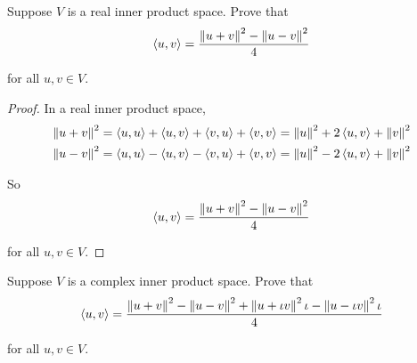 \begin{exercise}
    Suppose $V$ is a real inner product space. Prove that
    \[
        \left\langle{u, v}\right\rangle = \frac{\left\Vert{u + v}\right\Vert^{2} - \left\Vert{u - v}\right\Vert^{2}}{4}
    \]

    for all $u, v\in V$.
\end{exercise}

\begin{proof}
    In a real inner product space,
    \[
        \begin{split}
            \left\Vert{u+v}\right\Vert^{2} = \left\langle{u, u}\right\rangle + \left\langle{u, v}\right\rangle + \left\langle{v, u}\right\rangle + \left\langle{v,v}\right\rangle = \left\Vert{u}\right\Vert^{2} + 2\left\langle{u, v}\right\rangle + \left\Vert{v}\right\Vert^{2} \\
            \left\Vert{u-v}\right\Vert^{2} = \left\langle{u, u}\right\rangle - \left\langle{u, v}\right\rangle - \left\langle{v, u}\right\rangle + \left\langle{v,v}\right\rangle = \left\Vert{u}\right\Vert^{2} - 2\left\langle{u, v}\right\rangle + \left\Vert{v}\right\Vert^{2}
        \end{split}
    \]

    So
    \[
        \left\langle{u, v}\right\rangle = \frac{\left\Vert{u + v}\right\Vert^{2} - \left\Vert{u - v}\right\Vert^{2}}{4}
    \]

    for all $u, v\in V$.
\end{proof}
\newpage

\begin{exercise}
    Suppose $V$ is a complex inner product space. Prove that
    \[
        \left\langle{u, v}\right\rangle = \frac{\left\Vert{u + v}\right\Vert^{2} - \left\Vert{u - v}\right\Vert^{2} + \left\Vert{u + \iota v}\right\Vert^{2}\iota - \left\Vert{u - \iota v}\right\Vert^{2}\iota}{4}
    \]

    for all $u, v\in V$.
\end{exercise}

